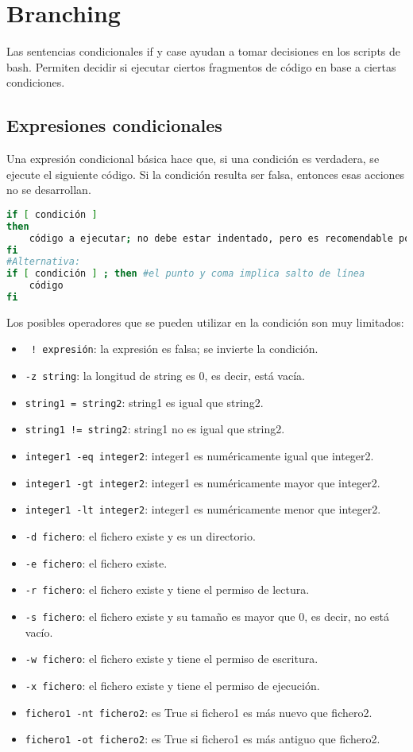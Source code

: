 \section{Branching}
Las sentencias condicionales if y case ayudan a tomar decisiones en los scripts de bash. Permiten decidir si ejecutar ciertos fragmentos de código en base a ciertas condiciones.

\subsection{Expresiones condicionales}
Una expresión condicional básica hace que, si una condición es verdadera, se ejecute el siguiente código. Si la condición resulta ser falsa, entonces esas acciones no se desarrollan.
\begin{lstlisting}[language = bash]
if [ condición ]
then
	código a ejecutar; no debe estar indentado, pero es recomendable por semejanza a Python
fi
#Alternativa:
if [ condición ] ; then #el punto y coma implica salto de línea
	código
fi
\end{lstlisting}

Los posibles operadores que se pueden utilizar en la condición son muy limitados: \begin{itemize}
\item\texttt{ ! expresión}: la expresión es falsa; se invierte la condición.
\item \texttt{-z string}: la longitud de string es 0, es decir, está vacía. 
\item \texttt{string1 = string2}: string1 es igual que string2.
\item \texttt{string1 != string2}: string1 no es igual que string2.
\item \texttt{integer1 -eq integer2}: integer1 es numéricamente igual que integer2.
\item \texttt{integer1 -gt integer2}: integer1 es numéricamente mayor que integer2.
\item \texttt{integer1 -lt integer2}: integer1 es numéricamente menor que integer2.
\item \texttt{-d fichero}: el fichero existe y es un directorio.
\item \texttt{-e fichero}: el fichero existe.
\item \texttt{-r fichero}: el fichero existe y tiene el permiso de lectura.
\item \texttt{-s fichero}: el fichero existe y su tamaño es mayor que 0, es decir, no está vacío.
\item \texttt{-w fichero}: el fichero existe y tiene el permiso de escritura.
\item \texttt{-x fichero}: el fichero existe y tiene el permiso de ejecución.
\item \texttt{fichero1 -nt fichero2}: es True si fichero1 es más nuevo que fichero2.
\item \texttt{fichero1 -ot fichero2}: es True si fichero1 es más antiguo que fichero2.
\end{itemize} 

